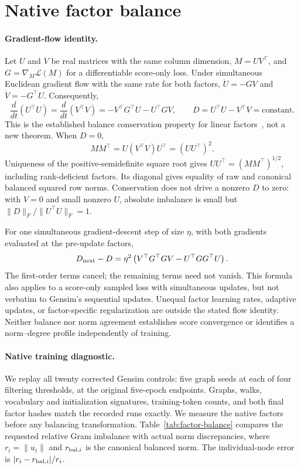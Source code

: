 \section{Native factor balance}
\label{sec:factor-balance}

\paragraph{Gradient-flow identity.}
Let \(U\) and \(V\) be real matrices with the same column dimension, \(M=UV^\top\), and \(G=\nabla_M\mathcal{L}(M)\) for a differentiable score-only loss.
Under simultaneous Euclidean gradient flow with the same rate for both factors, \(\dot U=-GV\) and \(\dot V=-G^\top U\).
Consequently,
\begin{equation}
 \frac{d}{dt}(U^\top U)=\frac{d}{dt}(V^\top V)
 =-V^\top G^\top U-U^\top GV,
 \qquad D=U^\top U-V^\top V=\text{constant}.
\end{equation}
This is the established balance conservation property for linear factors~\citep{du2018algorithmic}, not a new theorem.
When \(D=0\),
\begin{equation}
 MM^\top=U(V^\top V)U^\top=(UU^\top)^2.
\end{equation}
Uniqueness of the positive-semidefinite square root gives \(UU^\top=(MM^\top)^{1/2}\), including rank-deficient factors.
Its diagonal gives equality of raw and canonical balanced squared row norms.
Conservation does not drive a nonzero \(D\) to zero: with \(V=0\) and small nonzero \(U\), absolute imbalance is small but \(\|D\|_F/\|U^\top U\|_F=1\).

For one simultaneous gradient-descent step of size \(\eta\), with both gradients evaluated at the pre-update factors,
\begin{equation}
 D_{\rm next}-D=\eta^2\left(V^\top G^\top GV-U^\top GG^\top U\right).
\end{equation}
The first-order terms cancel; the remaining terms need not vanish.
This formula also applies to a score-only sampled loss with simultaneous updates, but not verbatim to Gensim's sequential updates.
Unequal factor learning rates, adaptive updates, or factor-specific regularization are outside the stated flow identity.
Neither balance nor norm agreement establishes score convergence or identifies a norm--degree profile independently of training.

\paragraph{Native training diagnostic.}
We replay all twenty corrected Gensim controls: five graph seeds at each of four filtering thresholds, at the original five-epoch endpoints.
Graphs, walks, vocabulary and initialization signatures, training-token counts, and both final factor hashes match the recorded runs exactly.
We measure the native factors before any balancing transformation.
Table~\ref{tab:factor-balance} compares the requested relative Gram imbalance with actual norm discrepancies, where \(r_i=\|u_i\|\) and \(r_{{\rm bal},i}\) is the canonical balanced norm.
The individual-node error is \(|r_i-r_{{\rm bal},i}|/r_i\).

